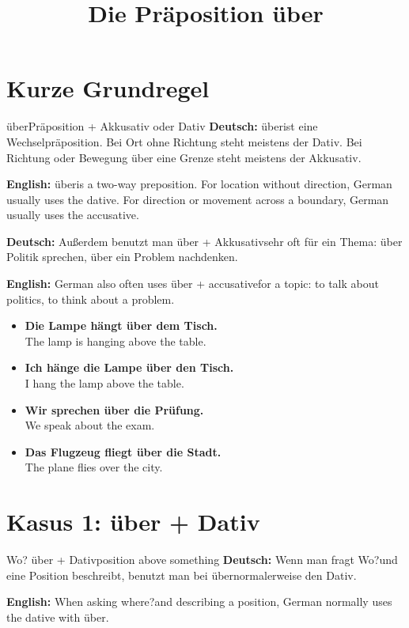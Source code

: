 \documentclass[a4paper,11pt]{article}
\title{Die Präposition \glqq über\grqq}
\date{}
\newcommand{\GermanText}[1]{\textbf{Deutsch: }#1\par}
\newcommand{\EnglishText}[1]{{\small\color{SoftGray}\textbf{English: }#1\par}}
\newcommand{\ExampleItem}[2]{\item \textbf{#1}\\{\small\color{SoftGray}#2}}
\begin{document}
    \maketitle
    \tableofcontents
    \newpage

\section{Kurze Grundregel}

\begin{grammarentry}{über}{Präposition + Akkusativ oder Dativ}
\GermanText{\glqq über\grqq ist eine Wechselpräposition. Bei Ort ohne Richtung steht meistens der Dativ. Bei Richtung oder Bewegung über eine Grenze steht meistens der Akkusativ.}
\EnglishText{\glqq über\grqq is a two-way preposition. For location without direction, German usually uses the dative. For direction or movement across a boundary, German usually uses the accusative.}

\GermanText{Außerdem benutzt man \glqq über + Akkusativ\grqq sehr oft für ein Thema: über Politik sprechen, über ein Problem nachdenken.}
\EnglishText{German also often uses \glqq über + accusative\grqq for a topic: to talk about politics, to think about a problem.}
\end{grammarentry}

\begin{exbox}
\begin{itemize}
    \ExampleItem{Die Lampe hängt über dem Tisch.}{The lamp is hanging above the table.}
    \ExampleItem{Ich hänge die Lampe über den Tisch.}{I hang the lamp above the table.}
    \ExampleItem{Wir sprechen über die Prüfung.}{We speak about the exam.}
    \ExampleItem{Das Flugzeug fliegt über die Stadt.}{The plane flies over the city.}
\end{itemize}
\end{exbox}

\section{Kasus 1: über + Dativ}

\begin{grammarentry}{Wo? über + Dativ}{position above something}
\GermanText{Wenn man fragt \glqq Wo?\grqq und eine Position beschreibt, benutzt man bei \glqq über\grqq normalerweise den Dativ.}
\EnglishText{When asking \glqq where?\grqq and describing a position, German normally uses the dative with \glqq über\grqq.}
\end{grammarentry}
\end{document}
